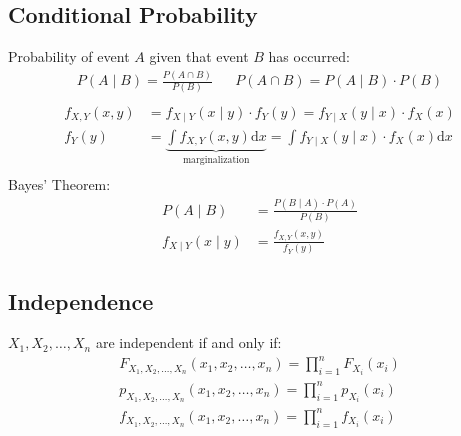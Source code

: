 \begin{mdframed}[style=eqbox]
  \subsection{Conditional Probability}
  Probability of event $A$ given that event $B$ has occurred:
  \begin{align*}
    P(A \mid B) = \frac{P(A \cap B)}{P(B)} && P(A \cap B) = P(A \mid B) \cdot P(B)\\
  \end{align*}
  \begin{align*}
    f_{X,Y}(x,y) &= f_{X \mid Y}(x \mid y) \cdot f_Y(y) = f_{Y \mid X}(y \mid x) \cdot f_X(x)\\
    f_{Y}(y) &= \underbrace{\int f_{X,Y}(x,y) \text{d}x}_{\text{marginalization}} = \int f_{Y \mid X}(y \mid x) \cdot f_X(x) \text{d}x\\
  \end{align*}
  Bayes' Theorem:
  \begin{align*}
    P(A \mid B) &= \frac{P(B \mid A) \cdot P(A)}{P(B)}\\
    f_{X \mid Y}(x \mid y) &= \frac{f_{X,Y}(x,y)}{f_Y(y)}
  \end{align*}
\end{mdframed}

\begin{mdframed}[style=eqbox]
  \subsection{Independence}
  $X_1, X_2, \ldots, X_n$ are independent if and only if:
  \begin{align*}
    F_{X_1, X_2, \ldots, X_n}(x_1, x_2, \ldots, x_n) = \prod_{i=1}^{n} F_{X_i}(x_i)\\
    p_{X_1, X_2, \ldots, X_n}(x_1, x_2, \ldots, x_n) = \prod_{i=1}^{n} p_{X_i}(x_i)\\
    f_{X_1, X_2, \ldots, X_n}(x_1, x_2, \ldots, x_n) = \prod_{i=1}^{n} f_{X_i}(x_i)
  \end{align*}
\end{mdframed}

